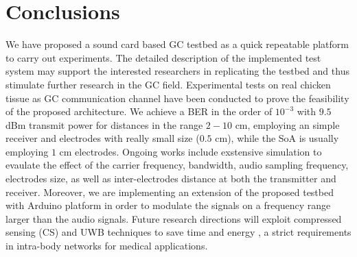 \section{Conclusions}

We have proposed a sound card based GC testbed as a quick repeatable platform to carry out experiments. The detailed description of the implemented test system may support the interested researchers in replicating the testbed and thus stimulate further research in the GC field.
Experimental tests on real chicken tissue as GC communication channel have been conducted to prove the feasibility of the proposed architecture.
We achieve a BER in the order of $10^{-3}$ with  $9.5$ dBm transmit power for distances in the range $2-10$ cm, employing an simple receiver and electrodes with really small size ($0.5$ cm), while the SoA is usually employing $1$ cm electrodes.
Ongoing works include exstensive simulation to evaulate the effect of the carrier frequency, bandwidth, audio sampling frequency, electrodes size, as well as inter-electrodes distance at both the transmitter and receiver. Moreover, we are implementing an extension of the proposed testbed with Arduino platform in order to modulate the signals on a frequency range larger than the audio signals. Future research directions will exploit compressed sensing (CS) and UWB techniques to save time and energy \cite{Banou2018,Alesii2015}, a strict requirements in intra-body networks for medical applications.